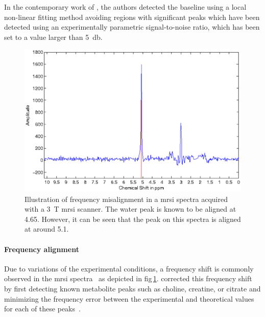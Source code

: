 In the contemporary work of \citeauthor{Tiwari2012}, the authors detected the baseline using a local non-linear fitting method avoiding regions with significant peaks which have been detected using an experimentally parametric signal-to-noise ratio, which has been set to a value larger than \SI{5}{\decibel}.

\begin{figure}
\centering
\includegraphics[width=0.7\linewidth]{3_review/figures/processing/pre-processing/frequency/frequency.eps}
\caption[Illustration of frequency misalignment in a \acs*{mrsi} spectra.]{Illustration of frequency misalignment in a \acs*{mrsi} spectra acquired with a \SI{3}{\tesla} \acs*{mrsi} scanner. The water peak is known to be aligned at \SI{4.65}{\ppm}. However, it can be seen that the peak on this spectra is aligned at around \SI{5.1}{\ppm}.}
\label{fig:frequency}
\end{figure}

\paragraph{Frequency alignment}
Due to variations of the experimental conditions, a frequency shift is commonly observed in the \ac{mrsi} spectra~\cite{Chen2002,Osorio-Garcia2012} as depicted in \acs{fig}\,\ref{fig:frequency}.
\citeauthor{Tiwari2012} corrected this frequency shift by first detecting known metabolite peaks such as choline, creatine, or citrate and minimizing the frequency error between the experimental and theoretical values for each of these peaks~\cite{Tiwari2012}.

